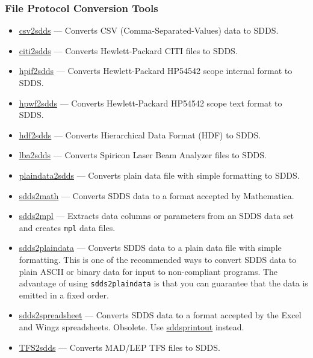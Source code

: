 \documentclass[11pt]{article}
\newcommand{\progref}[1]{\hyperref{#1}{{\tt #1} (}{)}{#1}}
\begin{document}
\subsubsection{File Protocol Conversion Tools}

\begin{itemize}
\item \progref{csv2sdds} --- Converts CSV (Comma-Separated-Values) data to SDDS.

\item \progref{citi2sdds} --- Converts Hewlett-Packard CITI files to SDDS.

\item \progref{hpif2sdds} --- Converts Hewlett-Packard HP54542 scope internal format to SDDS.

\item \progref{hpwf2sdds} --- Converts Hewlett-Packard HP54542 scope text format to SDDS.

\item \progref{hdf2sdds} --- Converts Hierarchical Data Format (HDF) to SDDS.

\item \progref{lba2sdds} --- Converts Spiricon Laser Beam Analyzer files to SDDS.

\item \progref{plaindata2sdds} --- Converts plain data file with simple formatting to SDDS.

\item \progref{sdds2math} --- Converts SDDS data to a format accepted by Mathematica.

\item \progref{sdds2mpl} --- Extracts data columns or parameters from an SDDS data set and creates \verb|mpl| data
files\cite{thesis}.

\item \progref{sdds2plaindata} --- Converts SDDS data to a plain data file with simple formatting.  This is
one of the recommended ways to convert SDDS data to plain ASCII or binary data for input to non-compliant
programs.  The advantage of using \verb|sdds2plaindata| is that you can guarantee that the data is 
emitted in a fixed order.

\item \progref{sdds2spreadsheet} --- Converts SDDS data to a format accepted by the Excel and Wingz spreadsheets.
Obsolete.  Use \progref{sddsprintout} instead.

\item \progref{TFS2sdds} --- Converts MAD/LEP TFS files to SDDS.

\end{itemize}
\end{document}
